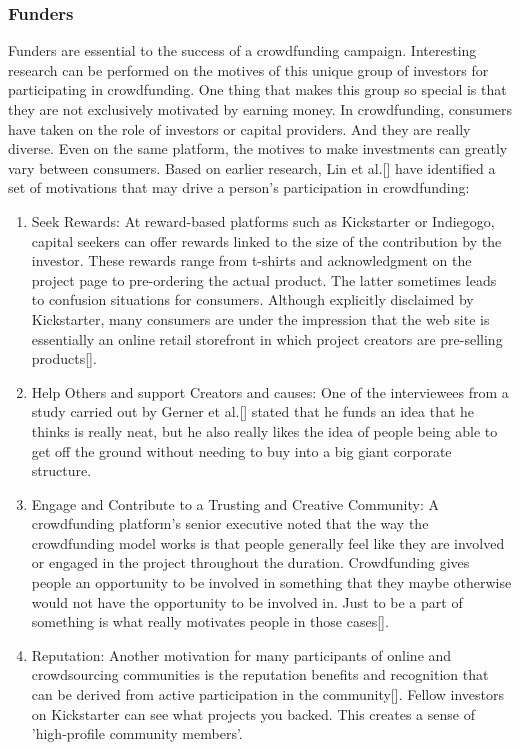 \subsubsection*{Funders}
Funders are essential to the success of a crowdfunding campaign. Interesting research can be performed on the motives of this unique group of investors for participating in crowdfunding. One thing that
makes this group so special is that they are not exclusively motivated by earning money.
In crowdfunding, consumers have taken on the role of investors or capital providers. And they are really diverse. Even on the same platform, the motives to make investments can greatly vary between consumers.
Based on earlier research, Lin et al.[\cite{doi:10.5465/ambpp.2014.209}] have identified a set of motivations that may drive a person’s participation in crowdfunding:

\begin{enumerate}
      \item Seek Rewards:
            At reward-based platforms such as Kickstarter or Indiegogo, capital seekers can offer rewards linked to the size of the contribution by the investor. These rewards range from t-shirts and
            acknowledgment on the project page to pre-ordering the actual product. The latter sometimes leads
            to confusion situations for consumers. Although explicitly disclaimed by Kickstarter, many consumers
            are under the impression that the web site is essentially an online retail storefront in which project
            creators are pre-selling products[\cite{10.2139/ssrn.2234765}].

      \item Help Others and support Creators and causes: One of the interviewees from a study carried out by Gerner et al.[\cite{inproceedings}]
            stated that he funds an idea that he thinks is really neat, but he also really likes the idea of people being
            able to get off the ground without needing to buy into a big giant corporate structure.

      \item Engage and Contribute to a Trusting and Creative Community:
            A crowdfunding platform’s senior executive noted that the way the crowdfunding model works is that people generally feel like they are involved or engaged in the project
            throughout the duration. Crowdfunding gives people an opportunity to be involved in something that
            they maybe otherwise would not have the opportunity to be involved in. Just to be a part of something
            is what really motivates people in those cases[\cite{inproceedings}].

      \item Reputation:
            Another motivation for many participants of online and crowdsourcing communities is
            the reputation benefits and recognition that can be derived from active participation in the community[\cite{doi:10.5465/ambpp.2014.209}].
            Fellow investors on Kickstarter can see what projects you backed. This creates a sense of ’high-profile
            community members’.
\end{enumerate}


